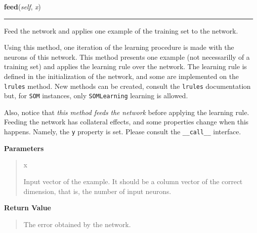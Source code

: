     \label{peach:nn:nn:SOM:feed}

    \vspace{0.5ex}

    \begin{boxedminipage}{\textwidth}

    \raggedright \textbf{feed}(\textit{self}, \textit{x})

    \vspace{-1.5ex}

    \rule{\textwidth}{0.5\fboxrule}

Feed the network and applies one example of the training set to the
network.

Using this method, one iteration of the learning procedure is made with
the neurons of this network. This method presents one example (not
necessarilly of a training set) and applies the learning rule over the
network. The learning rule is defined in the initialization of the
network, and some are implemented on the \texttt{lrules} method. New methods
can be created, consult the \texttt{lrules} documentation but, for
\texttt{SOM} instances, only \texttt{SOMLearning} learning is allowed.

Also, notice that \emph{this method feeds the network} before applying the
learning rule. Feeding the network has collateral effects, and some
properties change when this happens. Namely, the \texttt{y} property is set.
Please consult the \texttt{{\_}{\_}call{\_}{\_}} interface.
    \vspace{1ex}

      \textbf{Parameters}
      \begin{quote}
        \begin{Ventry}{x}

          \item[x]


Input vector of the example. It should be a column vector of the
correct dimension, that is, the number of input neurons.
        \end{Ventry}

      \end{quote}

    \vspace{1ex}

      \textbf{Return Value}
      \begin{quote}

The error obtained by the network.
      \end{quote}

    \vspace{1ex}

    \end{boxedminipage}

